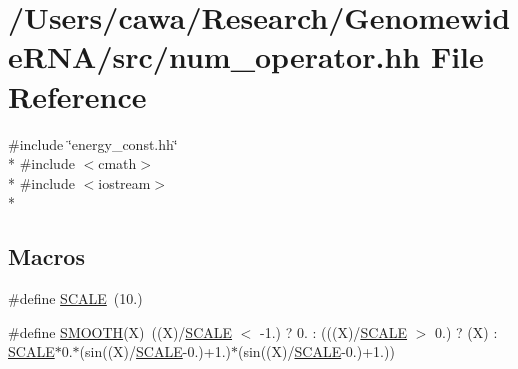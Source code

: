 \hypertarget{num__operator_8hh}{\section{/\+Users/cawa/\+Research/\+Genomewide\+R\+N\+A/src/num\+\_\+operator.hh File Reference}
\label{num__operator_8hh}
}
{\ttfamily \#include \char`\"{}energy\+\_\+const.\+hh\char`\"{}}\\*
{\ttfamily \#include $<$cmath$>$}\\*
{\ttfamily \#include $<$iostream$>$}\\*
\subsection*{Macros}
\begin{DoxyCompactItemize}
\item 
\#define \hyperlink{num__operator_8hh_a0cbea62f1ce2043dd08108e65ed8de1d}{S\+C\+A\+L\+E}~(10.)
\item 
\#define \hyperlink{num__operator_8hh_a0e75be7c3935c7c6d0b1dfba05fe37a6}{S\+M\+O\+O\+T\+H}(X)~((X)/\hyperlink{num__operator_8hh_a0cbea62f1ce2043dd08108e65ed8de1d}{S\+C\+A\+L\+E} $<$ -\/1.) ? 0. \+: (((X)/\hyperlink{num__operator_8hh_a0cbea62f1ce2043dd08108e65ed8de1d}{S\+C\+A\+L\+E} $>$ 0.) ? (X) \+: \hyperlink{num__operator_8hh_a0cbea62f1ce2043dd08108e65ed8de1d}{S\+C\+A\+L\+E}$\ast$0.$\ast$(sin((X)/\hyperlink{num__operator_8hh_a0cbea62f1ce2043dd08108e65ed8de1d}{S\+C\+A\+L\+E}-\/0.)+1.)$\ast$(sin((X)/\hyperlink{num__operator_8hh_a0cbea62f1ce2043dd08108e65ed8de1d}{S\+C\+A\+L\+E}-\/0.)+1.))
\end{DoxyCompactItemize}

